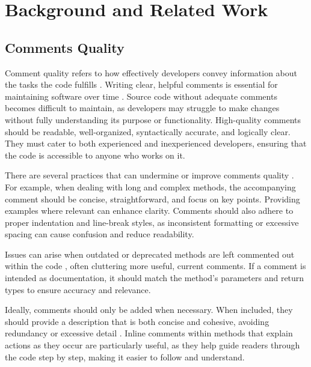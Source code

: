 
\chapter{Background and Related Work} %

\label{Chapter2} 

\section{Comments Quality}
Comment quality refers to how effectively developers convey information about the tasks the code fulfills \cite{Borstler2023}. Writing clear, helpful comments is essential for maintaining software over time \cite{code-comment-evolution}. Source code without adequate comments becomes difficult to maintain, as developers may struggle to make changes without fully understanding its purpose or functionality. High-quality comments should be readable, well-organized, syntactically accurate, and logically clear. They must cater to both experienced and inexperienced developers, ensuring that the code is accessible to anyone who works on it.

\noindent There are several practices that can undermine or improve comments quality \cite{ding2022good}. For example, when dealing with long and complex methods, the accompanying comment should be concise, straightforward, and focus on key points. Providing examples where relevant can enhance clarity. Comments should also adhere to proper indentation and line-break styles, as inconsistent formatting or excessive spacing can cause confusion and reduce readability.

\noindent Issues can arise when outdated or deprecated methods are left commented out within the code \cite{commentInconsistency} \cite{outdatedComments}, often cluttering more useful, current comments. If a comment is intended as documentation, it should match the method’s parameters and return types to ensure accuracy and relevance.

\noindent Ideally, comments should only be added when necessary. When included, they should provide a description that is both concise and cohesive, avoiding redundancy or excessive detail \cite{louis2018}. Inline comments within methods that explain actions as they occur are particularly useful, as they help guide readers through the code step by step, making it easier to follow and understand.

